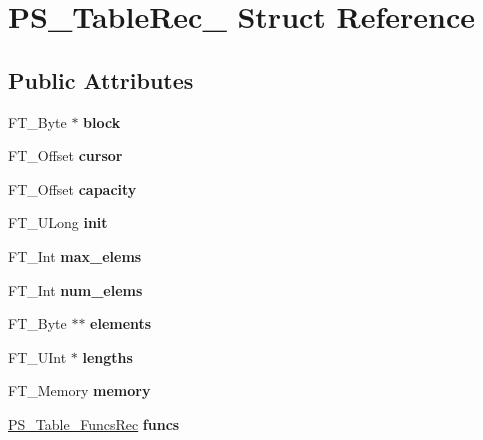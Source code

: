 \hypertarget{struct_p_s___table_rec__}{}\section{P\+S\+\_\+\+Table\+Rec\+\_\+ Struct Reference}
\label{struct_p_s___table_rec__}
\subsection*{Public Attributes}
\begin{DoxyCompactItemize}
\item 
\mbox{\label{struct_p_s___table_rec___a6caa7b6aef2ba7e28d260b6a87782723}} 
F\+T\+\_\+\+Byte $\ast$ {\bfseries block}
\item 
\mbox{\label{struct_p_s___table_rec___a8725d30f75b6dc785b988ed689ac7e58}} 
F\+T\+\_\+\+Offset {\bfseries cursor}
\item 
\mbox{\label{struct_p_s___table_rec___acf6d4f15ca247960cc7823b73d3c66bf}} 
F\+T\+\_\+\+Offset {\bfseries capacity}
\item 
\mbox{\label{struct_p_s___table_rec___a599789092ebf74a09033a6380c4c2a7c}} 
F\+T\+\_\+\+U\+Long {\bfseries init}
\item 
\mbox{\label{struct_p_s___table_rec___a8594ec199ad792ed7ffd558806a7d23b}} 
F\+T\+\_\+\+Int {\bfseries max\+\_\+elems}
\item 
\mbox{\label{struct_p_s___table_rec___a26706016251497b19039f2c002c4e9d5}} 
F\+T\+\_\+\+Int {\bfseries num\+\_\+elems}
\item 
\mbox{\label{struct_p_s___table_rec___a1967f81d98ea65a605968a7e1e5c51c3}} 
F\+T\+\_\+\+Byte $\ast$$\ast$ {\bfseries elements}
\item 
\mbox{\label{struct_p_s___table_rec___aeb8384606eec4117600c224dd8052f2b}} 
F\+T\+\_\+\+U\+Int $\ast$ {\bfseries lengths}
\item 
\mbox{\label{struct_p_s___table_rec___a061872add9c6d1af67cfdfac5ce2b80d}} 
F\+T\+\_\+\+Memory {\bfseries memory}
\item 
\mbox{\label{struct_p_s___table_rec___adced5ad36107c90012e9fafa55eab5b9}} 
\hyperlink{struct_p_s___table___funcs_rec__}{P\+S\+\_\+\+Table\+\_\+\+Funcs\+Rec} {\bfseries funcs}
\end{DoxyCompactItemize}


